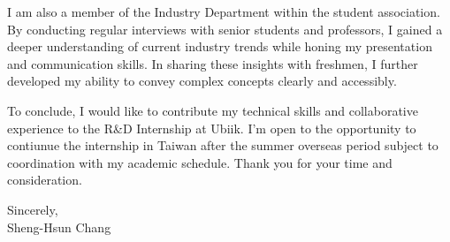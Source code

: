 \documentclass[12pt,a4paper]{article}
\newcommand{\Name}{Sheng-Hsun Chang}
\begin{document}
I am also a member of the Industry Department within the student association.
By conducting regular interviews with senior students and professors, I gained a deeper understanding of current 
industry trends while honing my presentation and communication skills. In sharing these insights with freshmen, 
I further developed my ability to convey complex concepts clearly and accessibly.

To conclude, I would like to contribute my technical skills and collaborative experience to the 
R\&D Internship at Ubiik. I'm open to the opportunity to contiunue the internship in Taiwan after the summer overseas period subject to coordination 
with my academic schedule. Thank you for your time and consideration.

Sincerely,\\
\vspace{10pt}
\Name
\end{document}
